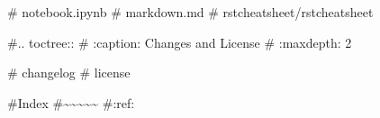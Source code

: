\documentclass[letterpaper,10pt,english]{sphinxmanual}
\begin{document}
\#    notebook.ipynb
\#    markdown.md
\#    rst\sphinxhyphen{}cheatsheet/rst\sphinxhyphen{}cheatsheet

\#.. toctree::
\#    :caption: Changes and License
\#    :maxdepth: 2

\#    change\sphinxhyphen{}log
\#    license

\#Index
\#\textasciitilde{}\textasciitilde{}\textasciitilde{}\textasciitilde{}\textasciitilde{}
\#:ref:



\renewcommand{\indexname}{Index}
\footnotesize\raggedright\printindex
\end{document}
